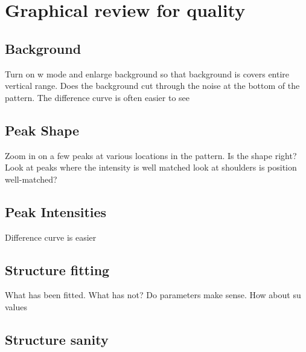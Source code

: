 \chapter{Graphical review for quality}

\section{Background}
Turn on w mode and enlarge background so that background is covers entire vertical range. Does the background cut through the noise at the bottom of the pattern. The difference curve is often easier to see 

\section{Peak Shape}
Zoom in on a few peaks at various locations in the pattern. Is the shape right? 
Look at peaks where the intensity is well matched
look at shoulders
is position well-matched?

\section{Peak Intensities}
Difference curve is easier

\section{Structure fitting}
What has been fitted. What has not?
Do parameters make sense. How about su values

\section{Structure sanity}

